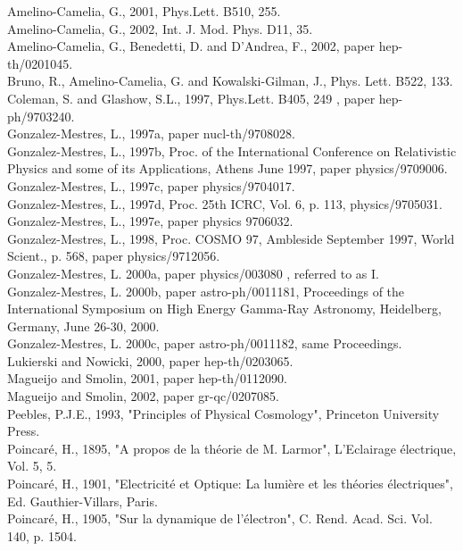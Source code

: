 \documentclass[a4paper,12pt,dvips]{article}
\begin{document}
\noindent
Amelino-Camelia, G., 2001, Phys.Lett. B510, 255. \\
Amelino-Camelia, G., 2002, Int. J. Mod. Phys. D11, 35.\\
Amelino-Camelia, G., Benedetti, D. and D'Andrea, F., 2002, paper hep-th/0201045.\\
Bruno, R., Amelino-Camelia, G. and Kowalski-Gilman, J., Phys. Lett. B522, 133.\\
Coleman, S. and Glashow, S.L., 1997, Phys.Lett. B405, 249 , paper hep-ph/9703240. \\
Gonzalez-Mestres, L., 1997a, paper nucl-th/9708028.\\
Gonzalez-Mestres, L., 1997b, Proc. of the International
Conference on Relativistic Physics and some of its Applications, Athens June 1997, paper physics/9709006. \\
Gonzalez-Mestres, L., 1997c, paper physics/9704017.\\
Gonzalez-Mestres, L., 1997d, Proc. 25th ICRC, Vol. 6, p. 113, physics/9705031.\\
Gonzalez-Mestres, L., 1997e, paper physics 9706032.\\
Gonzalez-Mestres, L., 1998, Proc. COSMO 97, Ambleside September 1997,
World Scient., p. 568, paper physics/9712056. \\
Gonzalez-Mestres, L. 2000a, paper physics/003080 , referred to as I.\\
Gonzalez-Mestres, L. 2000b, paper astro-ph/0011181, Proceedings of the International Symposium on High Energy Gamma-Ray Astronomy, Heidelberg, Germany, June 26-30, 2000. \\
Gonzalez-Mestres, L. 2000c, paper astro-ph/0011182, same Proceedings.\\
Lukierski and Nowicki, 2000, paper hep-th/0203065. \\
Magueijo and Smolin, 2001, paper hep-th/0112090. \\
Magueijo and Smolin, 2002, paper gr-qc/0207085. \\
Peebles, P.J.E., 1993, "Principles of Physical Cosmology", 
Princeton University Press.\\
Poincar\'e, H., 1895, "A propos de la th\'eorie de M. Larmor",
L'Eclairage \'electrique, Vol. 5,  5.\\
Poincar\'e, H., 1901, "Electricit\'e et Optique: La lumi\`ere
et les th\'eories \'electriques", Ed. Gauthier-Villars, Paris.\\
Poincar\'e, H., 1905, "Sur la dynamique de l'\'electron", C.
Rend. Acad. Sci. Vol. 140, p. 1504.\\
\end{document}
